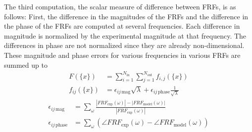 The third computation, the scalar measure of difference between FRFs, is as follows:
First, the difference in the magnitudes of the FRFs and the difference in the phase of the FRFs are computed at several frequencies. Each difference in magnitude is normalized by the experimental magnitude at that frequency. The differences in phase are not normalized since they are already non-dimensional. These magnitude and phase errors for various frequencies in various FRFs are summed up to 
\begin{align}
	F(\{x\}) &= \sum_{i=1}^{N_\text{in}} \sum_{j=1}^{N_\text{out}} f_{i,j}(\{x\}) \\
	f_{ij}(\{x\}) &= \epsilon_{ij \, \text{mag}} \sqrt{\lambda} + \epsilon_{ij \, \text{phase}} \frac{1}{\sqrt{\lambda}}
\end{align}
\begin{align}
	\epsilon_{ij \, \text{mag}} &= \sum_\omega \frac{|FRF_\text{exp} (\omega)| - |FRF_\text{model} (\omega)|}{|FRF_\text{exp} (\omega)|} \\
	\label{eq:phaseCompare}
	\epsilon_{ij \, \text{phase}} &= \sum_\omega \left( \angle FRF_\text{exp} (\omega) - \angle FRF_\text{model} (\omega) \right)
\end{align}
